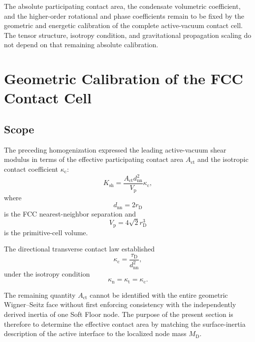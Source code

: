 The absolute participating contact area, the condensate volumetric coefficient, and the higher-order rotational and phase coefficients remain to be fixed by the geometric and energetic calibration of the complete active-vacuum contact cell. The tensor structure, isotropy condition, and gravitational propagation scaling do not depend on that remaining absolute calibration.

\section{Geometric Calibration of the FCC Contact Cell}

\subsection{Scope}

The preceding homogenization expressed the leading active-vacuum shear modulus in terms of the effective participating contact area $A_{\mathrm{ct}}$ and the isotropic contact coefficient $\kappa_{\mathrm{c}}$:
\begin{equation}
    K_{\mathrm{sh}} = \frac{ A_{\mathrm{ct}}d_{\mathrm{nn}}^2 }{ V_{\mathrm{p}} } \kappa_{\mathrm{c}},
\end{equation}
where
\begin{equation}
    d_{\mathrm{nn}} = 2r_{\mathrm{D}}
\end{equation}
is the FCC nearest-neighbor separation and
\begin{equation}
    V_{\mathrm{p}} = 4\sqrt{2}r_{\mathrm{D}}^3
\end{equation}
is the primitive-cell volume.

The directional transverse contact law established
\begin{equation}
    \kappa_{\mathrm{c}} = \frac{\tau_{\mathrm{D}}}{d_{\mathrm{nn}}^2},
\end{equation}
under the isotropy condition
\begin{equation}
    \kappa_{\mathrm{n}} = \kappa_{\mathrm{t}} = \kappa_{\mathrm{c}}.
\end{equation}

The remaining quantity $A_{\mathrm{ct}}$ cannot be identified with the entire geometric Wigner--Seitz face without first enforcing consistency with the independently derived inertia of one Soft Floor node. The purpose of the present section is therefore to determine the effective contact area by matching the surface-inertia description of the active interface to the localized node mass $M_{\mathrm{D}}$.

